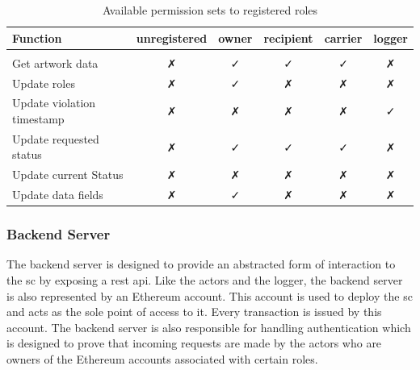 \begin{table}
\begin{tabular}{l|ccccc}
\textbf{Function}          & \textbf{unregistered} & \textbf{owner}       & \textbf{recipient}   & \textbf{carrier}     & \textbf{logger}      \\ \hline
                           & \multicolumn{1}{l}{}  & \multicolumn{1}{l}{} & \multicolumn{1}{l}{} & \multicolumn{1}{l}{} & \multicolumn{1}{l}{} \\
Get artwork data           & ✗                     & ✓                    & ✓                    & ✓                    & ✗                    \\
Update roles               & ✗                     & ✓                    & ✗                    & ✗                    & ✗                    \\
Update violation timestamp & ✗                     & ✗                    & ✗                    & ✗                    & ✓                    \\
Update requested status    & ✗                     & ✓                    & ✓                    & ✓                    & ✗                    \\
Update current Status      & ✗                     & ✗                    & ✗                    & ✗                    & ✗                    \\
Update data fields         & ✗                     & ✓                    & ✗                    & ✗                    & ✗                   
\end{tabular}
\caption{Available permission sets to registered roles}
\label{tab:permission_sets}
\end{table}

\subsubsection{Backend Server}
The backend server is designed to provide an abstracted form of interaction to the \gls{sc} by exposing a \gls{rest} \gls{api}. Like the actors and the logger, the backend server is also represented by an Ethereum account. This account is used to deploy the \gls{sc} and acts as the sole point of access to it. Every transaction is issued by this account. The backend server is also responsible for handling authentication which is designed to prove that incoming requests are made by the actors who are owners of the Ethereum accounts associated with certain roles.

